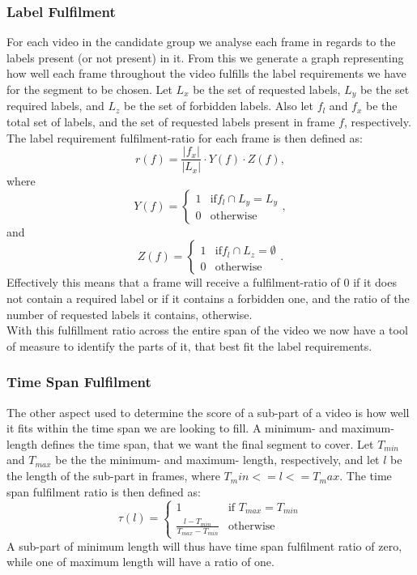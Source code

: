 \subsubsection{Label Fulfilment}
%
For each video in the candidate group we analyse each frame in regards to the labels present (or not present) in it. From this we generate a graph representing how well each frame throughout the video fulfills the label requirements we have for the segment to be chosen. Let $L_{x}$ be the set of requested labels, $L_{y}$ be the set required labels, and $L_{z}$ be the set of forbidden labels. Also let $f_{l}$ and $f_{x}$ be the total set of labels, and the set of requested labels present in frame $f$, respectively. The label requirement fulfilment-ratio for each frame is then defined as:\\
%
\begin{equation}
r(f) = \frac{|f_{x}|}{|L_{x}|} \cdot Y(f) \cdot Z(f),
\end{equation} 
%
where
%
\begin{equation}
Y(f) =
\begin{cases}
1 & \text{if} f_{l} \cap L_{y} = L_{y}\\
0 &  \text{otherwise}
\end{cases},
\end{equation} 
%
and
%
\begin{equation}
Z(f) =
\begin{cases}
1 & \text{if} f_{l} \cap L_{z} = \emptyset\\
0 &  \text{otherwise}
\end{cases}.
\end{equation} 
%
Effectively this means that a frame will receive a fulfilment-ratio of 0 if it does not contain a required label or if it contains a forbidden one, and the ratio of the number of requested labels it contains, otherwise.\\
%
With this fulfillment ratio across the entire span of the video we now have a tool of measure to identify the parts of it, that best fit the label requirements.
%
\subsubsection{Time Span Fulfilment}
%
The other aspect used to determine the score of a sub-part of a video is how well it fits within the time span we are looking to fill. A minimum- and maximum- length defines the time span, that we want the final segment to cover. Let $T_{min}$ and $T_{max}$ be the the minimum- and maximum- length, respectively, and let $l$ be the length of the sub-part in frames, where $T_min <= l <= T_max$. The time span fulfilment ratio is then defined as:\\
%
\begin{equation}
\tau(l) =
\begin{cases}
1 & \text{if } T_{max} = T_{min}\\
\frac{l-T_{min}}{T_{max}-T_{min}} &  \text{otherwise}
\end{cases}
\end{equation}\label{equ:fulfilment}
%
A sub-part of minimum length will thus have time span fulfilment ratio of zero, while one of maximum length will have a ratio of one. 
%
